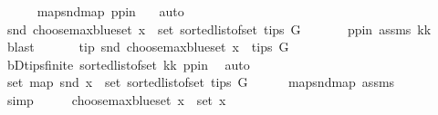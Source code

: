 \begin{isabellebody}
\ \ \ \ \isamarkupfalse%
\ map{\isacharunderscore}{\kern0pt}snd{\isacharunderscore}{\kern0pt}map\ pp{\isacharunderscore}{\kern0pt}in\ \ \isamarkupfalse%
\ auto\isanewline
\ \ \isamarkupfalse%
\ \isamarkupfalse%
\ {\isachardoublequoteopen}snd\ {\isacharparenleft}{\kern0pt}choose{\isacharunderscore}{\kern0pt}max{\isacharunderscore}{\kern0pt}blue{\isacharunderscore}{\kern0pt}set\ x{\isacharparenright}{\kern0pt}\ {\isasymin}\ set\ {\isacharparenleft}{\kern0pt}sorted{\isacharunderscore}{\kern0pt}list{\isacharunderscore}{\kern0pt}of{\isacharunderscore}{\kern0pt}set\ {\isacharparenleft}{\kern0pt}tips\ G{\isacharparenright}{\kern0pt}{\isacharparenright}{\kern0pt}{\isachardoublequoteclose}\ \isanewline
\ \ \ \ \isamarkupfalse%
\ pp{\isacharunderscore}{\kern0pt}in\ assms{\isacharparenleft}{\kern0pt}{}{\isacharparenright}{\kern0pt}\ kk\ \isamarkupfalse%
\ blast\ \isanewline
\ \ \isamarkupfalse%
\ \isamarkupfalse%
\ tip{\isacharcolon}{\kern0pt}\ {\isachardoublequoteopen}snd\ {\isacharparenleft}{\kern0pt}choose{\isacharunderscore}{\kern0pt}max{\isacharunderscore}{\kern0pt}blue{\isacharunderscore}{\kern0pt}set\ x{\isacharparenright}{\kern0pt}\ {\isasymin}\ tips\ G{\isachardoublequoteclose}\isanewline
\ \ \ \ \isamarkupfalse%
\ bD{\isachardot}{\kern0pt}tips{\isacharunderscore}{\kern0pt}finite\ sorted{\isacharunderscore}{\kern0pt}list{\isacharunderscore}{\kern0pt}of{\isacharunderscore}{\kern0pt}set{\isacharparenleft}{\kern0pt}{}{\isacharparenright}{\kern0pt}\ kk\ pp{\isacharunderscore}{\kern0pt}in\ \isamarkupfalse%
\ auto\isanewline
\ \ \isamarkupfalse%
\ {\isachardoublequoteopen}set\ {\isacharparenleft}{\kern0pt}map\ snd\ x{\isacharparenright}{\kern0pt}\ {\isacharequal}{\kern0pt}\ set\ {\isacharparenleft}{\kern0pt}sorted{\isacharunderscore}{\kern0pt}list{\isacharunderscore}{\kern0pt}of{\isacharunderscore}{\kern0pt}set\ {\isacharparenleft}{\kern0pt}tips\ G{\isacharparenright}{\kern0pt}{\isacharparenright}{\kern0pt}{\isachardoublequoteclose}\isanewline
\ \ \ \ \isamarkupfalse%
\ map{\isacharunderscore}{\kern0pt}snd{\isacharunderscore}{\kern0pt}map\ assms{\isacharparenleft}{\kern0pt}{}{\isacharparenright}{\kern0pt}\ \isanewline
\ \ \ \ \isamarkupfalse%
\ simp\isanewline
\ \ \isamarkupfalse%
\ \isamarkupfalse%
\ {\isachardoublequoteopen}choose{\isacharunderscore}{\kern0pt}max{\isacharunderscore}{\kern0pt}blue{\isacharunderscore}{\kern0pt}set\ x\ {\isasymin}\ set\ x{\isachardoublequoteclose}\ \isamarkupfalse%

\end{isabellebody}
